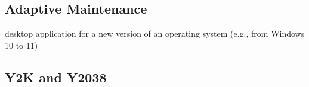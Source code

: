 
\subsection{Adaptive Maintenance}
\begin{frame}{\insertsubsection}
	\begin{fancycolumns}
		\begin{definition}{\insertsubsection\mysource{\lientzswanson}}
			 \hfill {}
		\end{definition}
		\begin{example}{}
			desktop application for a new version of an operating system (e.g., from Windows 10 to 11)
		\end{example}
		\nextcolumn
	\end{fancycolumns}
\end{frame}

\subsection{Y2K and Y2038}

